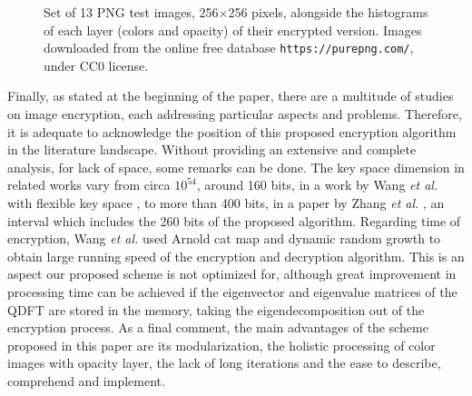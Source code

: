 \begin{figure}[htbp]
\caption{Set of 13 PNG test images, 256$ \times $256 pixels, alongside the histograms of each layer (colors and opacity) of their encrypted version. Images downloaded from the online free database \texttt{https://purepng.com/}, under CC0 license.}
\label{fig:allhistograms}
\end{figure}

Finally, as stated at the beginning of the paper, there are a multitude of studies on image encryption, each addressing particular aspects and problems. Therefore, it is adequate to acknowledge the position of this proposed encryption algorithm in the literature landscape. Without providing an extensive and complete analysis, for lack of space, some remarks can be done. The key space dimension in related works vary from circa $ 10^{54} $, around 160 bits, in a work by Wang \textit{et al.} with flexible key space \cite{wang2015novel}, to more than 400 bits, in a paper by Zhang \textit{et al.} \cite{zhang2015new}, an interval which includes the 260 bits of the proposed algorithm. Regarding time of encryption, Wang \textit{et al.} \cite{wang2015novelchaotic} used Arnold cat map and dynamic random growth to obtain large running speed of the encryption and decryption algorithm. This is an aspect our proposed scheme is not optimized for, although great improvement in processing time can be achieved if the eigenvector and eigenvalue matrices of the QDFT are stored in the memory, taking the eigendecomposition out of the encryption process. As a final comment, the main advantages of the scheme proposed in this paper are its modularization, the holistic processing of color images with opacity layer, the lack of long iterations and the ease to describe, comprehend and implement.


